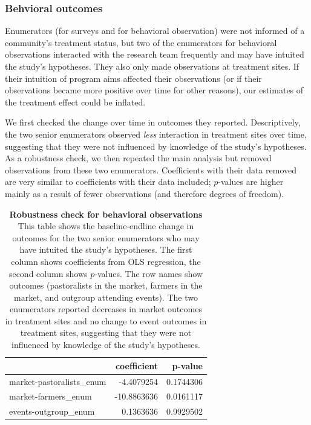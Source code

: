 \documentclass[
]{article}
\begin{document}
\hypertarget{behvioral-outcomes}{%
\subsubsection{Behvioral outcomes}\label{behvioral-outcomes}}

Enumerators (for surveys and for behavioral observation) were not
informed of a community's treatment status, but two of the enumerators
for behavioral observations interacted with the research team frequently
and may have intuited the study's hypotheses. They also only made
observations at treatment sites. If their intuition of program aims
affected their observations (or if their observations became more
positive over time for other reasons), our estimates of the treatment
effect could be inflated.

We first checked the change over time in outcomes they reported.
Descriptively, the two senior enumerators observed \emph{less}
interaction in treatment sites over time, suggesting that they were not
influenced by knowledge of the study's hypotheses. As a robustness
check, we then repeated the main analysis but removed observations from
these two enumerators. Coefficients with their data removed are very
similar to coefficients with their data included; \(p\)-values are
higher mainly as a result of fewer observations (and therefore degrees
of freedom).

\begin{table}[H]
\begin{center}
\label{tab:behObs_enumsOnly_tab}
\caption{\textbf{Robustness check for behavioral observations} This table shows the baseline-endline change in outcomes for the two senior enumerators who may have intuited the study's hypotheses. The first column shows coefficients from OLS regression, the second column shows $p$-values. The row names show outcomes (pastoralists in the market, farmers in the market, and outgroup attending events). The two enumerators reported decreases in market outcomes in treatment sites and no change to event outcomes in treatment sites, suggesting that they were not influenced by knowledge of the study's hypotheses.}
\smallskip

\begin{tabular}{l|r|r}
\hline
  & coefficient & p-value\\
\hline
market-pastoralists\_enum & -4.4079254 & 0.1744306\\
\hline
market-farmers\_enum & -10.8863636 & 0.0161117\\
\hline
events-outgroup\_enum & 0.1363636 & 0.9929502\\
\hline
\end{tabular}


\end{center}
\end{table}
\end{document}
